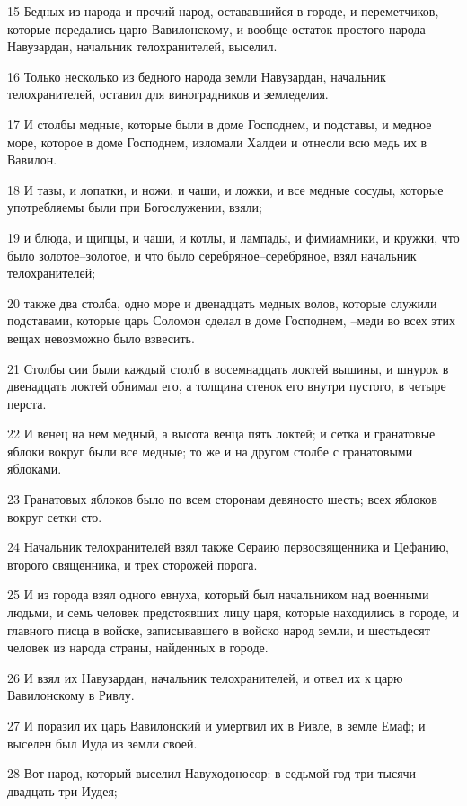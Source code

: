 \par 15 Бедных из народа и прочий народ, остававшийся в городе, и переметчиков, которые передались царю Вавилонскому, и вообще остаток простого народа Навузардан, начальник телохранителей, выселил.
\par 16 Только несколько из бедного народа земли Навузардан, начальник телохранителей, оставил для виноградников и земледелия.
\par 17 И столбы медные, которые были в доме Господнем, и подставы, и медное море, которое в доме Господнем, изломали Халдеи и отнесли всю медь их в Вавилон.
\par 18 И тазы, и лопатки, и ножи, и чаши, и ложки, и все медные сосуды, которые употребляемы были при Богослужении, взяли;
\par 19 и блюда, и щипцы, и чаши, и котлы, и лампады, и фимиамники, и кружки, что было золотое--золотое, и что было серебряное--серебряное, взял начальник телохранителей;
\par 20 также два столба, одно море и двенадцать медных волов, которые служили подставами, которые царь Соломон сделал в доме Господнем, --меди во всех этих вещах невозможно было взвесить.
\par 21 Столбы сии были каждый столб в восемнадцать локтей вышины, и шнурок в двенадцать локтей обнимал его, а толщина стенок его внутри пустого, в четыре перста.
\par 22 И венец на нем медный, а высота венца пять локтей; и сетка и гранатовые яблоки вокруг были все медные; то же и на другом столбе с гранатовыми яблоками.
\par 23 Гранатовых яблоков было по всем сторонам девяносто шесть; всех яблоков вокруг сетки сто.
\par 24 Начальник телохранителей взял также Сераию первосвященника и Цефанию, второго священника, и трех сторожей порога.
\par 25 И из города взял одного евнуха, который был начальником над военными людьми, и семь человек предстоявших лицу царя, которые находились в городе, и главного писца в войске, записывавшего в войско народ земли, и шестьдесят человек из народа страны, найденных в городе.
\par 26 И взял их Навузардан, начальник телохранителей, и отвел их к царю Вавилонскому в Ривлу.
\par 27 И поразил их царь Вавилонский и умертвил их в Ривле, в земле Емаф; и выселен был Иуда из земли своей.
\par 28 Вот народ, который выселил Навуходоносор: в седьмой год три тысячи двадцать три Иудея;
